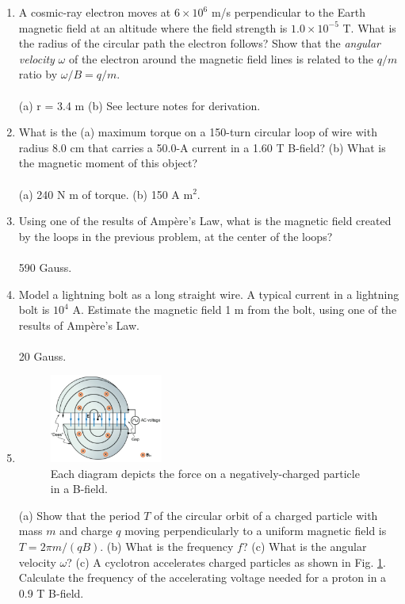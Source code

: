 \documentclass[10pt]{article}
\begin{document}
\begin{enumerate}
\begin{enumerate}
(a) To the right. (b) Into the page. (c) Down.
\item A cosmic-ray electron moves at $6 \times 10^6$ m/s perpendicular to the Earth magnetic field at an altitude where the field strength is $1.0 \times 10^{-5}$ T. What is the radius of the circular path the electron follows?  Show that the \textit{angular velocity} $\omega$ of the electron around the magnetic field lines is related to the $q/m$ ratio by $\omega/B = q/m$. \\ \\ (a) r = 3.4 m (b) See lecture notes for derivation.
\item What is the (a) maximum torque on a 150-turn circular loop of wire with radius 8.0 cm that carries a 50.0-A current in a 1.60 T B-field? (b) What is the magnetic moment of this object? \\ \\ (a) 240 N m of torque. (b) 150 A m$^2$.
\item Using one of the results of Amp\`{e}re's Law, what is the magnetic field created by the loops in the previous problem, at the center of the loops? \\ \\ 590 Gauss.
\item Model a lightning bolt as a long straight wire.  A typical current in a lightning bolt is $10^4$ A. Estimate the magnetic field 1 m from the bolt, using one of the results of Amp\`{e}re's Law. \\ \\ 20 Gauss.
\item 
\begin{figure}[hb]
\centering
\includegraphics[width=0.35\textwidth]{cyclo.png}
\caption{\label{fig:cyclo} Each diagram depicts the force on a negatively-charged particle in a B-field.}
\end{figure}
(a) Show that the period $T$ of the circular orbit of a charged particle with mass $m$ and charge $q$ moving perpendicularly to a uniform magnetic field is $T = 2\pi m/(qB)$. (b) What is the frequency $f$? (c) What is the angular velocity $\omega$?  (c) A cyclotron accelerates charged particles as shown in Fig. \ref{fig:cyclo}. Calculate the frequency of the accelerating voltage needed for a proton in a 0.9 T B-field. \\ \\

\end{enumerate}
\end{enumerate}
\end{document}
